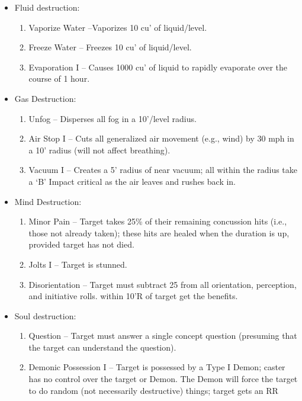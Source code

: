 \documentclass[oneside,12pt]{book}
\begin{document}
\begin{flushleft}
\begin{description}
{\begin{itemize}
\begin{enumerate}
target’s body are disrupted as if the target had fallen a
long distance. If the target fails their RR by (1-10), they
takes an ‘A’ Impact critical; (11-20) = ‘B’; (21-30) = ‘C’;
(31-40) = ‘D’; (41-up) = ‘E’.
\end{enumerate}
\item Fluid destruction:
\begin{enumerate}
\scriptsize
\item Vaporize Water –Vaporizes 10 cu’ of liquid/level.
\item Freeze Water – Freezes 10 cu’ of liquid/level.
\item Evaporation I – Causes 1000 cu’ of liquid to rapidly
evaporate over the course of 1 hour.
\end{enumerate}
\item Gas Destruction:
\begin{enumerate}
\scriptsize
\item Unfog – Disperses all fog in a 10’/level radius.
\item Air Stop I – Cuts all generalized air movement (e.g., wind)
by 30 mph in a 10’ radius (will not affect breathing).
\item Vacuum I – Creates a 5’ radius of near vacuum; all
within the radius take a ‘B’ Impact critical as the air
leaves and rushes back in.
\end{enumerate}
\item Mind Destruction:
\begin{enumerate}
\scriptsize
\item Minor Pain – Target takes 25\% of their remaining
concussion hits (i.e., those not already taken); these
hits are healed when the duration is up, provided
target has not died.
\item  Jolts I – Target is stunned.
\item  Disorientation – Target must subtract 25 from all
orientation, perception, and initiative rolls.
within 10’R of target get the benefits.
\end{enumerate}
\item Soul destruction:
\begin{enumerate}
\scriptsize
\item Question – Target must answer a single concept question
(presuming that the target can understand the question).
\item Demonic Possession I – Target is possessed by a Type
I Demon; caster has no control over the target or
Demon. The Demon will force the target to do random
(not necessarily destructive) things; target gets an RR

\end{enumerate}
\end{itemize}}
\end{description}
\end{flushleft}
\end{document}
